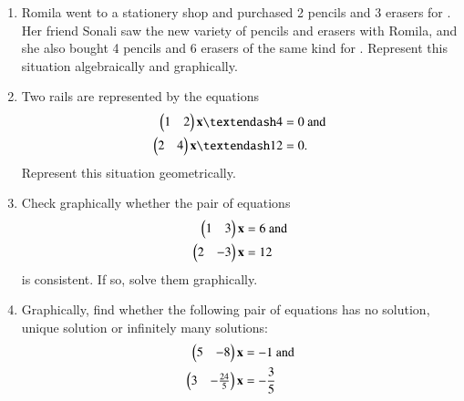 \renewcommand{\theequation}{\theenumi}
\begin{enumerate}[label=\arabic*.,ref=\thesubsection.\theenumi]

\item Romila went to a stationery shop and purchased 2 pencils and 3 erasers for . Her friend Sonali saw the new variety of pencils and erasers with Romila, and she also bought 4 pencils and 6 erasers of the same kind for . Represent this situation algebraically and graphically.
\item Two rails are represented by the equations 
\begin{align}
\myvec{1 & 2}\vec{x} – 4 &= 0 \text{ and}
\\
\myvec{ 2 & 4}\vec{x} – 12 &= 0. 
\end{align}
%
Represent this situation geometrically.
%
\item Check graphically whether the pair of equations 
\begin{align}
\begin{pmatrix}1 & 3\end{pmatrix}\mathbf{x}  &= 6 \text{ and}
\\
\begin{pmatrix} 2 & -3\end{pmatrix}\mathbf{x} &= 12 
\end{align}
%
is consistent. If so, solve them graphically.
%
\item Graphically, find whether the following pair of equations has no solution, unique solution or infinitely many solutions: 
%
\begin{align}
\begin{pmatrix}5 & -8\end{pmatrix}\mathbf{x}  &= -1 \text{ and}
\\
\begin{pmatrix} 3 & -\frac{24}{5}\end{pmatrix}\mathbf{x} &= -\frac{3}{5}
\end{align}
%

\end{enumerate}
%
